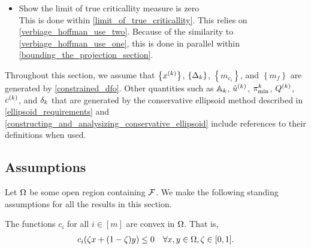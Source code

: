 \begin{itemize}
\item Show the limit of true criticallity measure is zero \\
This is done within \cref{limit_of_true_criticallity}.
This relies on \cref{verbiage_hoffman_use_two}.
Because of the similarity to \cref{verbiage_hoffman_use_one}, this is done in parallel within \cref{bounding_the_projection_section}.
\end{itemize}

Throughout this section, we assume that 
$\left\{x^{(k)}\right\}$,
$\left\{\Delta_k\right\}$,
$\left\{m_{c_i}\right\}$,
and
$\left\{m_{f}\right\}$
are generated by 
\cref{constrained_dfo}.
Other quantities such as ${\mathbb A_{k}}$, ${{\hat u}^{(k)}}$, ${\pi^k_{\textrm{min}}}$, ${Q^{(k)}}$, ${c^{(k)}}$, and ${\delta_k}$ 
that are generated by the conservative ellipsoid method described in
\cref{ellipsoid_requirements} and \cref{constructing_and_analysizing_conservative_ellipsoid}
include references to their definitions when used.


\subsection{Assumptions}
Let $\Omega$ be some open region containing ${\mathcal F}$.
We make the following standing assumptions for all the results in this section.

\begin{assumption}
\label{constraints_are_convex}
The functions $c_i$ for all $i \in [m]$ are convex in $ \Omega $. That is, 
\begin{align*}
c_i(\zeta x + (1 - \zeta) y) \le 0 \quad \forall x, y \in \Omega, \zeta \in [0, 1].
\end{align*}
\end{assumption}


